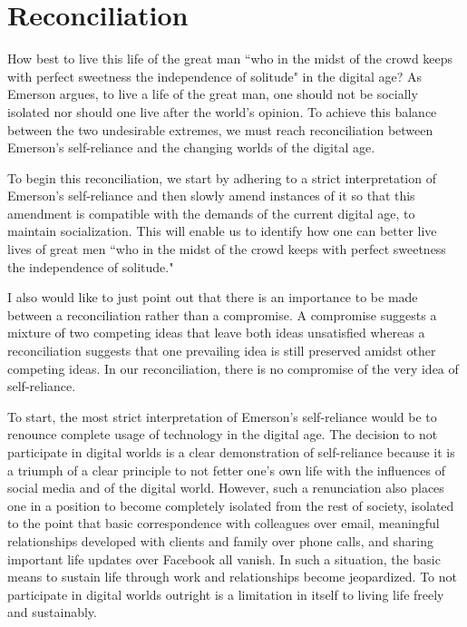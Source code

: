 \documentclass[12pt,letterpaper]{article}
\begin{document}
\section{Reconciliation}
How best to live this life of the great man ``who in the midst of the crowd keeps with perfect sweetness the independence of solitude" in the digital age?  As Emerson argues, to live a life of the great man, one should not be socially isolated nor should one live after the world's opinion.   To achieve this balance between the two undesirable extremes, we must reach reconciliation between Emerson's self-reliance and the changing worlds of the digital age.

To begin this reconciliation, we start by adhering to a strict interpretation of Emerson's self-reliance and then slowly amend instances of it so that this amendment is compatible with the demands of the current digital age, to maintain socialization.  This will enable us to identify how one can better live lives of great men ``who in the midst of the crowd keeps with perfect sweetness the independence of solitude."

I also would like to just point out that there is an importance to be made between a reconciliation rather than a compromise.  A compromise suggests a mixture of two competing ideas that leave both ideas unsatisfied whereas a reconciliation suggests that one prevailing idea is still preserved amidst other competing ideas.  In our reconciliation, there is no compromise of the very idea of self-reliance.

To start, the most strict interpretation of Emerson's self-reliance would be to renounce complete usage of technology in the digital age.  The decision to not participate in digital worlds is a clear demonstration of self-reliance because it is a triumph of a clear principle to not fetter one's own life with the influences of social media and of the digital world.  However, such a renunciation also places one in a position to become completely isolated from the rest of society, isolated to the point that basic correspondence with colleagues over email, meaningful relationships developed with clients and family over phone calls, and sharing important life updates over Facebook all vanish.  In such a situation, the basic means to sustain life through work and relationships become jeopardized.  To not participate in digital worlds outright is a limitation in itself to living life freely and sustainably.
\end{document}
